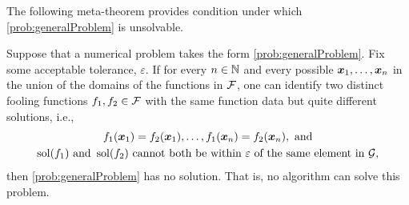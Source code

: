 The following meta-theorem provides condition under which \cref{prob:generalProblem} is unsolvable.

\begin{theorem} \label{thm:impossible}
Suppose that a numerical problem takes the form \cref{prob:generalProblem}.  Fix some acceptable tolerance, $\varepsilon$.  If for every $n \in \mathbb{N}$ and every possible $\boldsymbol{x}_1, \ldots, \boldsymbol{x}_n$ in the union of the domains of the functions in $\mathcal{F}$, one can identify two distinct fooling functions $f_1, f_2 \in \mathcal{F}$ with the same function data but quite different solutions, i.e.,
\begin{gather} \label{eq:bumpfunctionsmatch}
    f_1(\boldsymbol{x}_1) = f_2(\boldsymbol{x}_1), \ldots,  f_1(\boldsymbol{x}_n) = f_2(\boldsymbol{x}_n), \text{ and} \\
    \label{eq:solutionsfar}
    \operatorname{sol}(f_1) \text{ and } \operatorname{sol}(f_2) \text{ cannot both be within $\varepsilon$ of the same element in $\mathcal{G}$},
\end{gather}
then \cref{prob:generalProblem} has no solution.  That is, no algorithm can solve this problem.
\end{theorem}
